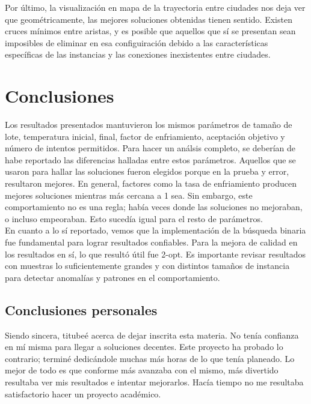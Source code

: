 \documentclass[9pt,a4paper,twocolumn,twoside]{tau-class/tau}
\begin{document}
Por \'ultimo, la visualizaci\'on en mapa de la trayectoria entre ciudades nos deja ver que geom\'etricamente, las mejores soluciones obtenidas tienen sentido. Existen cruces m\'inimos entre aristas, y es posible que aquellos que s\'i se presentan sean imposibles de eliminar en esa configuiraci\'on debido a las caracter\'isticas espec\'ificas de las instancias y las conexiones inexistentes entre ciudades.\\





\section{Conclusiones}

Los resultados presentados mantuvieron los mismos par\'ametros de tamaño de lote, temperatura inicial, final, factor de enfriamiento, aceptaci\'on objetivo y n\'umero de intentos permitidos. Para hacer un an\'alsis completo, se deber\'ian de habe reportado las diferencias halladas entre estos par\'ametros. Aquellos que se usaron para hallar las soluciones fueron elegidos porque en la prueba y error, resultaron mejores. En general, factores como la tasa de enfriamiento producen mejores soluciones mientras m\'as cercana a 1 sea. Sin embargo, este comportamiento no es una regla; hab\'ia veces donde las soluciones no mejoraban, o incluso empeoraban. Esto suced\'ia igual para el resto de par\'ametros.\\

En cuanto a lo s\'i reportado, vemos que la implementaci\'on de la b\'usqueda binaria fue fundamental para lograr resultados confiables. Para la mejora de calidad en los resultados en s\'i, lo que result\'o \'util fue 2-opt. Es importante revisar resultados con muestras lo suficientemente grandes y con distintos tamaños de instancia para detectar anomal\'ias y patrones en el comportamiento. \\

        
    \subsection*{Conclusiones personales}
    Siendo sincera, titubeé acerca de dejar inscrita esta materia. No tenía confianza en mí misma para llegar a soluciones decentes. Este proyecto ha probado lo contrario; terminé dedicándole muchas más horas de lo que tenía planeado. Lo mejor de todo es que conforme más avanzaba con el mismo, más divertido resultaba ver mis resultados e intentar mejorarlos. Hacía tiempo no me resultaba satisfactorio hacer un proyecto académico.\\
\end{document}
